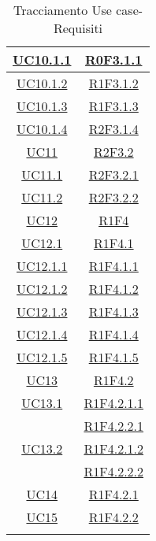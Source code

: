 \begin{longtable}{|c|c|}
\hline
\hyperlink{UC10.1.1}{UC10.1.1} & \hyperlink{R0F3.1.1}{R0F3.1.1}\\
\hline
\hyperlink{UC10.1.2}{UC10.1.2} & \hyperlink{R1F3.1.2}{R1F3.1.2}\\
\hline
\hyperlink{UC10.1.3}{UC10.1.3} & \hyperlink{R1F3.1.3}{R1F3.1.3}\\
\hline
\hyperlink{UC10.1.4}{UC10.1.4} & \hyperlink{R2F3.1.4}{R2F3.1.4}\\
\hline
\hyperlink{UC11}{UC11} & \hyperlink{R2F3.2}{R2F3.2}\\
\hline
\hyperlink{UC11.1}{UC11.1} & \hyperlink{R2F3.2.1}{R2F3.2.1}\\
\hline
\hyperlink{UC11.2}{UC11.2} & \hyperlink{R2F3.2.2}{R2F3.2.2}\\
\hline
\hyperlink{UC12}{UC12} & \hyperlink{R1F4}{R1F4}\\
\hline
\hyperlink{UC12.1}{UC12.1} & \hyperlink{R1F4.1}{R1F4.1}\\
\hline
\hyperlink{UC12.1.1}{UC12.1.1} & \hyperlink{R1F4.1.1}{R1F4.1.1}\\
\hline
\hyperlink{UC12.1.2}{UC12.1.2} & \hyperlink{R1F4.1.2}{R1F4.1.2}\\
\hline
\hyperlink{UC12.1.3}{UC12.1.3} & \hyperlink{R1F4.1.3}{R1F4.1.3}\\
\hline
\hyperlink{UC12.1.4}{UC12.1.4} & \hyperlink{R1F4.1.4}{R1F4.1.4}\\
\hline
\hyperlink{UC12.1.5}{UC12.1.5} & \hyperlink{R1F4.1.5}{R1F4.1.5}\\
\hline
\hyperlink{UC13}{UC13} & \hyperlink{R1F4.2}{R1F4.2}\\
\hline
\hyperlink{UC13.1}{UC13.1} & \hyperlink{R1F4.2.1.1}{R1F4.2.1.1}\\
& \hyperlink{R1F4.2.2.1}{R1F4.2.2.1}\\
\hline
\hyperlink{UC13.2}{UC13.2} & \hyperlink{R1F4.2.1.2}{R1F4.2.1.2}\\
& \hyperlink{R1F4.2.2.2}{R1F4.2.2.2}\\
\hline
\hyperlink{UC14}{UC14} & \hyperlink{R1F4.2.1}{R1F4.2.1}\\
\hline
\hyperlink{UC15}{UC15} & \hyperlink{R1F4.2.2}{R1F4.2.2}\\
\hline
\caption[Tracciamento Use case-Requisiti]{Tracciamento Use case-Requisiti}
\label{tabella:requi-usecase}
\end{longtable}
\clearpage
